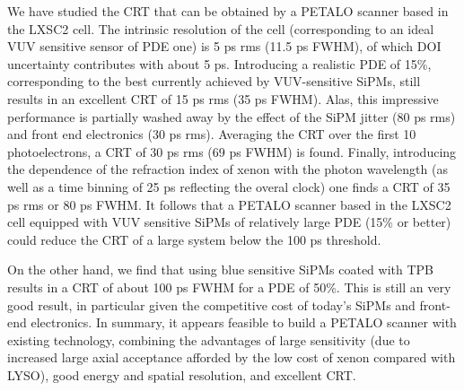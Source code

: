 \documentclass[review]{elsarticle}
\begin{document}
We have studied the CRT that can be obtained by a PETALO scanner based in the LXSC2 cell. The intrinsic resolution of the cell (corresponding to an ideal VUV sensitive sensor of PDE one) is 5 ps rms (11.5 ps FWHM), of which DOI uncertainty contributes with about 5 ps. Introducing a realistic PDE of 15\%, corresponding to the best currently achieved by VUV-sensitive SiPMs, still results in an excellent CRT of  15 ps rms (35 ps FWHM). Alas, this impressive performance is partially washed away by the effect of the SiPM jitter (80 ps rms) and front end electronics (30 ps rms). Averaging the CRT over the first 10 photoelectrons, a CRT of 30 ps rms (69 ps FWHM) is found. Finally, introducing the dependence of the 
refraction index of xenon with the photon wavelength (as well as a time binning of 25 ps reflecting the overal clock) one finds a CRT of 35 ps rms or 80 ps FWHM. It follows that a PETALO scanner based in the LXSC2 cell equipped with VUV sensitive SiPMs of relatively large PDE (15\% or better) could reduce the CRT of a large system below the 100 ps threshold. 

On the other hand, we find that using blue sensitive SiPMs coated with TPB results in a CRT of about 100 ps FWHM for a PDE of 50\%. This is still an very good result, in particular given the competitive cost of today's SiPMs and  front-end electronics.  In summary, it appears feasible to build a PETALO scanner with existing technology, combining the advantages of large sensitivity (due to increased large axial acceptance afforded by the low cost of xenon compared with LYSO), good energy and spatial resolution, and excellent CRT.     

\section*{}


\end{document}

